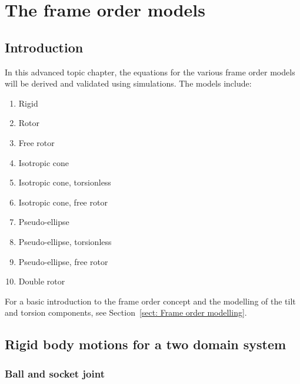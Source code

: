
\chapter{The frame order models}
\label{ch: The frame order models}





\section{Introduction}

In this advanced topic chapter, the equations for the various frame order models will be derived and validated using simulations.  The models include:
\begin{enumerate}
    \item Rigid
    \item Rotor
    \item Free rotor
    \item Isotropic cone
    \item Isotropic cone, torsionless
    \item Isotropic cone, free rotor
    \item Pseudo-ellipse
    \item Pseudo-ellipse, torsionless
    \item Pseudo-ellipse, free rotor
    \item Double rotor
\end{enumerate}

For a basic introduction to the frame order concept and the modelling of the tilt and torsion components, see Section~\ref{sect: Frame order modelling}.




\section{Rigid body motions for a two domain system}





\subsection{Ball and socket joint}

